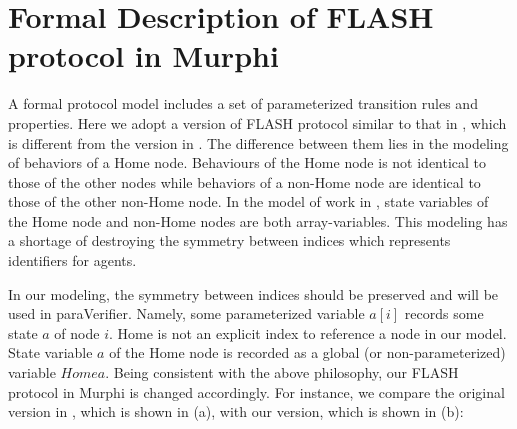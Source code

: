 \documentclass{llncs}
\begin{document}




\section{Formal Description of FLASH protocol in Murphi\label{sec:formalDescription}}
A formal protocol model includes a set of parameterized transition rules and properties.  Here we adopt a version of FLASH protocol similar to that in \cite{cubeicBeyond}, which is different from the version in \cite{Chou2004}. The difference between them lies in the modeling of behaviors of a Home node. Behaviours of the Home node is not identical to those of the other nodes while behaviors of
 a non-Home node are identical to those of the other non-Home node. In the model of work in \cite{Chou2004}, state variables of the Home node and non-Home nodes are both array-variables. This modeling has a shortage of destroying the symmetry between indices which represents identifiers for agents.

In our modeling, the symmetry between indices should be preserved and will be used in {\sf paraVerifier}. Namely,  %
some parameterized variable $a[i]$ records some state  $a$ of node $i$. Home is not an explicit index to reference a node in our model. State variable
  $a$ of the Home node  is recorded as a global  (or non-parameterized) variable $Homea$. %
 Being consistent with the above philosophy, our FLASH protocol in Murphi is changed accordingly. For instance, we compare the original version in \cite{Chou2004}, which is shown in (a), with our version, which is shown in (b):
\end{document}
